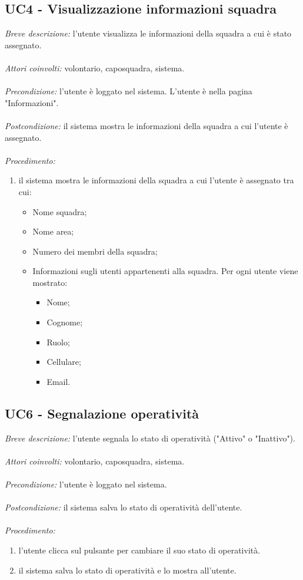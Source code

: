 \subsection{UC4 - Visualizzazione informazioni squadra}
\textit{Breve descrizione:} l'utente visualizza le informazioni della squadra a cui è stato assegnato.
\\
\\
\textit{Attori coinvolti:} volontario, caposquadra, sistema.
\\
\\
\textit{Precondizione:} l'utente è loggato nel sistema. L'utente è nella pagina "Informazioni".
\\
\\
\textit{Postcondizione:} il sistema mostra le informazioni della squadra a cui l'utente è assegnato.
\\
\\
\textit{Procedimento:}
\begin{enumerate}
	\item il sistema mostra le informazioni della squadra a cui l'utente è assegnato tra cui:
	\begin{itemize}
		\item Nome squadra;
		\item Nome area;
		\item Numero dei membri della squadra;
		\item Informazioni sugli utenti appartenenti alla squadra. Per ogni utente viene mostrato:
		\begin{itemize}
			\item Nome;
			\item Cognome;
			\item Ruolo;
			\item Cellulare;
			\item Email.
		\end{itemize}
	\end{itemize}
\end{enumerate}

\subsection{UC6 - Segnalazione operatività}
\textit{Breve descrizione:} l'utente segnala lo stato di operatività ("Attivo" o "Inattivo"). 
\\
\\
\textit{Attori coinvolti:} volontario, caposquadra, sistema.
\\
\\
\textit{Precondizione:} l'utente è loggato nel sistema.
\\
\\
\textit{Postcondizione:} il sistema salva lo stato di operatività dell'utente.
\\
\\
\textit{Procedimento:}
\begin{enumerate}
	\item l'utente clicca sul pulsante per cambiare il suo stato di operatività.
	\item il sistema salva lo stato di operatività e lo mostra all'utente.
\end{enumerate}



